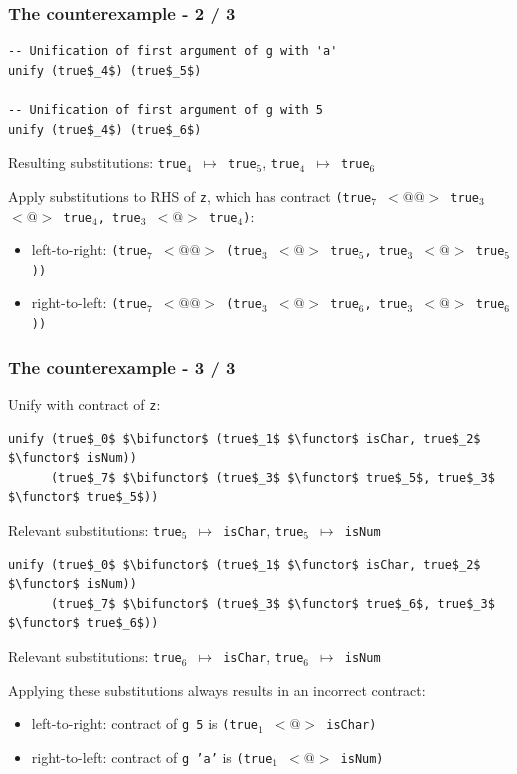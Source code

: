 \documentclass[]{beamer}
\makeatletter
\newcommand{\functor}{<\!\!\!@\!\!\!>}
\newcommand{\bifunctor}{<\!\!\!@\!\!@\!\!\!>}
\makeatother
\begin{document}
\begin{frame}[fragile]
\frametitle{The counterexample - 2 / 3}

\begin{lstlisting}[mathescape]
-- Unification of first argument of g with 'a'
unify (true$_4$) (true$_5$)

-- Unification of first argument of g with 5
unify (true$_4$) (true$_6$)
\end{lstlisting}

Resulting substitutions: \texttt{true$_4$ $\mapsto$ true$_5$}, \texttt{true$_4$ $\mapsto$ true$_6$}

Apply substitutions to RHS of \texttt{z}, which has contract \texttt{(true$_7$ $\bifunctor$ true$_3$ $\functor$ true$_4$, true$_3$ $\functor$ true$_4$)}:

\begin{itemize}
	\item left-to-right: \texttt{(true$_7$ $\bifunctor$ (true$_3$ $\functor$ true\emph{$_5$}, true$_3$ $\functor$ true\emph{$_5$}))}
	\item right-to-left: \texttt{(true$_7$ $\bifunctor$ (true$_3$ $\functor$ true\emph{$_6$}, true$_3$ $\functor$ true\emph{$_6$}))}
\end{itemize}

\end{frame}

\begin{frame}[fragile]
\frametitle{The counterexample - 3 / 3}

Unify with contract of \texttt{z}:

\begin{lstlisting}[mathescape]
unify (true$_0$ $\bifunctor$ (true$_1$ $\functor$ isChar, true$_2$ $\functor$ isNum))
      (true$_7$ $\bifunctor$ (true$_3$ $\functor$ true$_5$, true$_3$ $\functor$ true$_5$))
\end{lstlisting}

Relevant substitutions: \texttt{true$_5$ $\mapsto$ isChar}, \texttt{true$_5$ $\mapsto$ isNum}

\begin{lstlisting}[mathescape]
unify (true$_0$ $\bifunctor$ (true$_1$ $\functor$ isChar, true$_2$ $\functor$ isNum))
      (true$_7$ $\bifunctor$ (true$_3$ $\functor$ true$_6$, true$_3$ $\functor$ true$_6$))
\end{lstlisting}

Relevant substitutions: \texttt{true$_6$ $\mapsto$ isChar}, \texttt{true$_6$ $\mapsto$ isNum}

Applying these substitutions always results in an incorrect contract:
\begin{itemize}
\item left-to-right: contract of \texttt{g 5} is \texttt{(true$_1$ $\functor$ isChar)}
\item right-to-left: contract of \texttt{g 'a'} is \texttt{(true$_1$ $\functor$ isNum)}
\end{itemize}

\end{frame}
\end{document}
